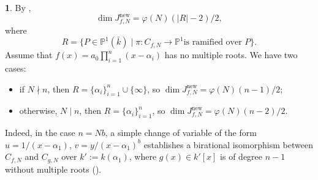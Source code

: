 \documentclass{amsart}[11pt]
\theoremstyle{definition}
\newtheorem{sect}[thm]{}
\numberwithin{equation}{section}
\theoremstyle{notitle}
\begin{document}
\begin{sect}
  By \cite[Corollary 5.4]{MR1708603}, 
  \begin{equation}
    \label{eq:14}
\dim J_{f,N}^{\mathrm{new}}= \varphi(N)({\lvert {R} \rvert}-2)/2,    
  \end{equation}
  where \[R=\{ P \in {\mathbb{P}}^1(\bar{k})\mid \pi: C_{f,N}\to {\mathbb{P}}^1 \text{
    is ramified over } P\}.\] Assume that
  $f(x)=a_0\prod_{i=1}^n(x-\alpha_i)$ has no multiple roots. We have
  two cases:
  \begin{itemize}
  \item if $N\nmid n$, then $R=\{\alpha_i\}_{i=1}^n\cup \{ \infty\}$,
    so $\dim J_{f,N}^{\mathrm{new}}= \varphi(N)(n-1)/2$;
\item otherwise, $N\mid n$, then $R=\{\alpha_i\}_{i=1}^n$, so $\dim
  J_{f,N}^{\mathrm{new}}= \varphi(N)(n-2)/2$.
  \end{itemize}
  Indeed, in the case $n=Nb$, a simple change of variable of the form
  $u=1/(x-\alpha_1)$, $v=y/(x-\alpha_1)^b$ establishes a birational
  isomorphism between $C_{f,N}$ and $C_{g,N}$ over $k':=k(\alpha_1)$,
  where $g(x)\in k'[x]$ is of degree $n-1$ without multiple roots (\cite[Remark 4.3]{MR2166091}).
\end{sect}
\end{document}
